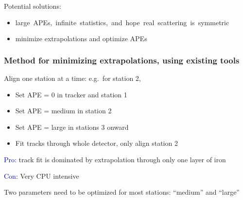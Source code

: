 \documentclass[compress]{beamer}
\begin{document}
\begin{frame}
\vspace{0.2 cm}
Potential solutions:
\begin{itemize}
\item \mbox{large APEs, infinite statistics, and hope real scattering is symmetric \hspace{-1 cm}}
\item minimize extrapolations and optimize APEs
\end{itemize}
\end{frame}

\begin{frame}
\frametitle{Method for minimizing extrapolations, using existing tools}

Align one station at a time: e.g.\ for station 2,

\begin{itemize}
\item Set APE = 0 in tracker and station 1
\item Set APE = medium in station 2
\item Set APE = large in stations 3 onward
\item Fit tracks through whole detector, only align station 2
\end{itemize}

\vfill
\textcolor{darkblue}{Pro:} track fit is dominated by extrapolation through only one layer of iron

\vspace{0.1 cm}
\textcolor{darkblue}{Con:} Very CPU intensive

\vfill
Two parameters need to be optimized for most stations: ``medium'' and ``large''
\end{frame}
\end{document}
